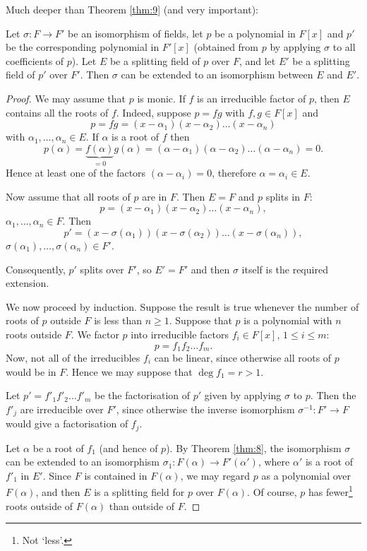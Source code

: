 Much deeper than Theorem \ref{thm:9} (and very important):

\begin{theorem}\label{thm:10}
	Let $\sigma : F \to F'$ be an isomorphism of fields, let $p$ be a polynomial in $F[x]$ and $p'$ be the corresponding polynomial in $F'[x]$ (obtained from $p$ by applying $\sigma$ to all coefficients of $p$). Let $E$ be a splitting field of $p$ over $F$, and let $E'$ be a splitting field of $p'$ over $F'$. Then $\sigma$ can be extended to an isomorphism between $E$ and $E'$.
	\begin{proof}
		We may assume that $p$ is monic. If $f$ is an irreducible factor of $p$, then $E$ contains all the roots of $f$. Indeed, suppose $p = fg$ with $f, g \in F[x]$ and
		\[
			p = fg = (x - \alpha_1)(x - \alpha_2)\dots(x - \alpha_n)
		\]
		with $\alpha_1, \dots, \alpha_n \in E$. If $\alpha$ is a root of $f$ then
		\[
			p(\alpha) = \underbrace{f(\alpha)}_{= 0}g(\alpha) = (\alpha - \alpha_1)(\alpha - \alpha_2)\dots(\alpha - \alpha_n) = 0.
		\]
		Hence at least one of the factors $(\alpha - \alpha_i) = 0$, therefore $\alpha = \alpha_i \in E$.
		
		Now assume that all roots of $p$ are in $F$. Then $E = F$ and $p$ splits in $F$:
		\[
			p = (x - \alpha_1)(x - \alpha_2)\dots(x - \alpha_n),
		\]
		$\alpha_1, \dots, \alpha_n \in F$. Then
		\[
			p' = (x - \sigma(\alpha_1))(x - \sigma(\alpha_2))\dots(x - \sigma(\alpha_n)),
		\]
		$\sigma(\alpha_1), \dots, \sigma(\alpha_n) \in F'$.
		
		Consequently, $p'$ splits over $F'$, so $E' = F'$ and then $\sigma$ itself is the required extension.
		
		We now proceed by induction. Suppose the result is true whenever the number of roots of $p$ outside $F$ is less than $n \geq 1$. Suppose that $p$ is a polynomial with $n$ roots outside $F$. We factor $p$ into irreducible factors $f_i \in F[x]$, $1 \leq i \leq m$:
		\[
			p = f_1 f_2 \dots f_m.
		\]
		Now, not all of the irreducibles $f_i$ can be linear, since otherwise all roots of $p$ would be in $F$. Hence we may suppose that $\deg{f_1} = r > 1$.
		
		Let $p' = f'_1 f'_2 \dots f'_m$ be the factorisation of $p'$ given by applying $\sigma$ to $p$. Then the $f'_j$ are irreducible over $F'$, since otherwise the inverse isomorphism $\sigma^{-1} : F' \to F$ would give a factorisation of $f_j$.
		
		Let $\alpha$ be a root of $f_1$ (and hence of $p$). By Theorem \ref{thm:8}, the isomorphism $\sigma$ can be extended to an isomorphism $\sigma_1 : F(\alpha) \to F'(\alpha')$, where $\alpha'$ is a root of $f'_1$ in $E'$. Since $F$ is contained in $F(\alpha)$, we may regard $p$ as a polynomial over $F(\alpha)$, and then $E$ is a splitting field for $p$ over $F(\alpha)$. Of course, $p$ has fewer\footnote{Not `less'.} roots outside of $F(\alpha)$ than outside of $F$.
		

\end{proof}
\end{theorem}
